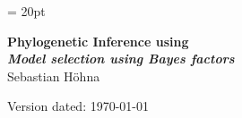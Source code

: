 \documentclass[11pt]{article}
\begin{document}
\renewcommand{\headrulewidth}{0.5pt}
\headsep = 20pt
\lhead{ }

\thispagestyle{plain}
\begin{center}

\textbf{\LARGE Phylogenetic Inference using \RevBayes}\\\vspace{2mm}
\textbf{\it{\Large Model selection using Bayes factors}}\\\vspace{2mm}
\vspace{1cm}
{\Large Sebastian H{\"o}hna}
\vspace{1cm}
\end{center}

\def \ResourcePath {./}
\def \GlobalResourcePath {../}


Version dated: \today
\end{document}
